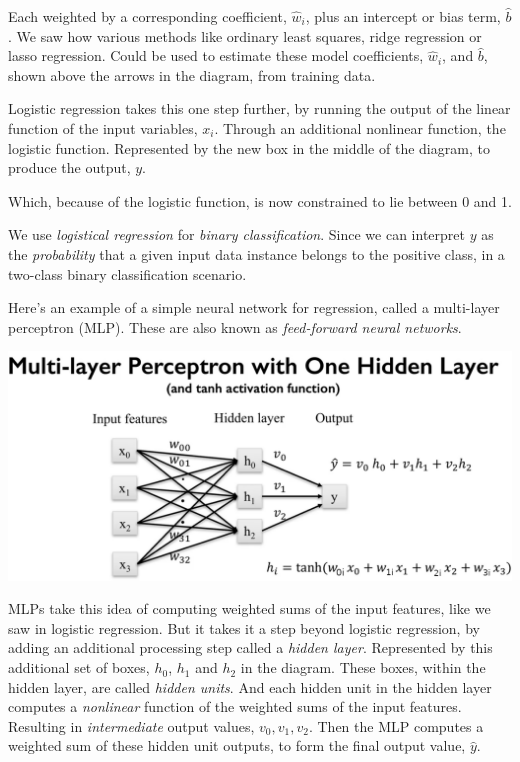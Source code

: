 \begin{multicols}{2}
Each weighted by a corresponding coefficient, $\hat{w}_i$, plus an intercept or bias term, $\hat{b}$. We saw how various methods like ordinary least squares, ridge regression or lasso regression. Could be used to estimate these model coefficients, $\hat{w}_i$, and $\hat{b}$, shown above the arrows in the diagram, from training data. 

Logistic regression takes this one step further, by running the output of the linear function of the input variables, $x_i$. Through an additional nonlinear function, the logistic function. Represented by the new box in the middle of the diagram, to produce the output, $y$. 

Which, because of the logistic function, is now constrained to lie between 0 and 1. 

We use \emph{logistical regression} for \emph{binary classification}. Since we can interpret $y$ as the \emph{probability} that a given input data instance belongs to the positive class, in a two-class binary classification scenario. 

Here's an example of a simple neural network for regression, called a multi-layer perceptron (MLP). These are also known as \emph{feed-forward neural networks}.

\begin{center}
	\includegraphics[width=\linewidth]{img/Multi-layer-Perseptron.png} 
\end{center}

MLPs take this idea of computing weighted sums of the input features, like we saw in logistic regression. But it takes it a step beyond logistic regression, by adding an additional processing step called a \emph{hidden layer}. Represented by this additional set of boxes, $h_0$, $h_1$ and $h_2$ in the diagram. These boxes, within the hidden layer, are called \emph{hidden units}. And each hidden unit in the hidden layer computes a \emph{nonlinear} function of the weighted sums of the input features. Resulting in \emph{intermediate} output values, $v_0, v_1, v_2$. Then the MLP computes a weighted sum of these hidden unit outputs, to form the final output value, $\hat{y}$. 


\end{multicols}

